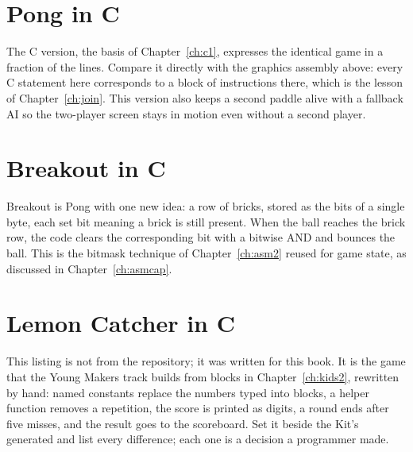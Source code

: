 

\section{Pong in C}

The C version, the basis of Chapter~\ref{ch:c1}, expresses the identical game in a
fraction of the lines. Compare it directly with the graphics assembly above: every
C statement here corresponds to a block of instructions there, which is the lesson
of Chapter~\ref{ch:join}. This version also keeps a second paddle alive with a
fallback AI so the two-player screen stays in motion even without a second player.



\section{Breakout in C}

Breakout is Pong with one new idea: a row of bricks, stored as the bits of a single
byte, each set bit meaning a brick is still present. When the ball reaches the
brick row, the code clears the corresponding bit with a bitwise AND and bounces the
ball. This is the bitmask technique of Chapter~\ref{ch:asm2} reused for game state,
as discussed in Chapter~\ref{ch:asmcap}.



\section{Lemon Catcher in C}

This listing is not from the \prg repository; it was written for this book. It
is the game that the Young Makers track builds from blocks in
Chapter~\ref{ch:kids2}, rewritten by hand: named constants replace the numbers
typed into blocks, a helper function removes a repetition, the score is printed
as digits, a round ends after five misses, and the result goes to the
scoreboard. Set it beside the Kit's generated
 and list every difference;
each one is a decision a programmer made.


